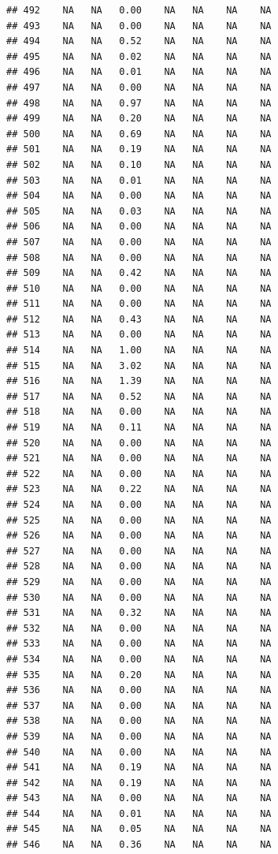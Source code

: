 \documentclass{article}\usepackage{graphicx, color}
\makeatletter
\newenvironment{kframe}{%
 \def\at@end@of@kframe{}%
 \ifinner\ifhmode%
  \def\at@end@of@kframe{\end{minipage}}%
  \begin{minipage}{\columnwidth}%
 \fi\fi%
 \def\FrameCommand##1{\hskip\@totalleftmargin \hskip-\fboxsep
 \colorbox{shadecolor}{##1}\hskip-\fboxsep
     \hskip-\linewidth \hskip-\@totalleftmargin \hskip\columnwidth}%
 \MakeFramed {\advance\hsize-\width
   \@totalleftmargin\z@ \linewidth\hsize
   \@setminipage}}%
 {\par\unskip\endMakeFramed%
 \at@end@of@kframe}
\newenvironment{knitrout}{}{} %
\makeatother
\begin{document}
\begin{knitrout}
\begin{kframe}
\begin{verbatim}
## 492    NA   NA   0.00    NA   NA    NA    NA
## 493    NA   NA   0.00    NA   NA    NA    NA
## 494    NA   NA   0.52    NA   NA    NA    NA
## 495    NA   NA   0.02    NA   NA    NA    NA
## 496    NA   NA   0.01    NA   NA    NA    NA
## 497    NA   NA   0.00    NA   NA    NA    NA
## 498    NA   NA   0.97    NA   NA    NA    NA
## 499    NA   NA   0.20    NA   NA    NA    NA
## 500    NA   NA   0.69    NA   NA    NA    NA
## 501    NA   NA   0.19    NA   NA    NA    NA
## 502    NA   NA   0.10    NA   NA    NA    NA
## 503    NA   NA   0.01    NA   NA    NA    NA
## 504    NA   NA   0.00    NA   NA    NA    NA
## 505    NA   NA   0.03    NA   NA    NA    NA
## 506    NA   NA   0.00    NA   NA    NA    NA
## 507    NA   NA   0.00    NA   NA    NA    NA
## 508    NA   NA   0.00    NA   NA    NA    NA
## 509    NA   NA   0.42    NA   NA    NA    NA
## 510    NA   NA   0.00    NA   NA    NA    NA
## 511    NA   NA   0.00    NA   NA    NA    NA
## 512    NA   NA   0.43    NA   NA    NA    NA
## 513    NA   NA   0.00    NA   NA    NA    NA
## 514    NA   NA   1.00    NA   NA    NA    NA
## 515    NA   NA   3.02    NA   NA    NA    NA
## 516    NA   NA   1.39    NA   NA    NA    NA
## 517    NA   NA   0.52    NA   NA    NA    NA
## 518    NA   NA   0.00    NA   NA    NA    NA
## 519    NA   NA   0.11    NA   NA    NA    NA
## 520    NA   NA   0.00    NA   NA    NA    NA
## 521    NA   NA   0.00    NA   NA    NA    NA
## 522    NA   NA   0.00    NA   NA    NA    NA
## 523    NA   NA   0.22    NA   NA    NA    NA
## 524    NA   NA   0.00    NA   NA    NA    NA
## 525    NA   NA   0.00    NA   NA    NA    NA
## 526    NA   NA   0.00    NA   NA    NA    NA
## 527    NA   NA   0.00    NA   NA    NA    NA
## 528    NA   NA   0.00    NA   NA    NA    NA
## 529    NA   NA   0.00    NA   NA    NA    NA
## 530    NA   NA   0.00    NA   NA    NA    NA
## 531    NA   NA   0.32    NA   NA    NA    NA
## 532    NA   NA   0.00    NA   NA    NA    NA
## 533    NA   NA   0.00    NA   NA    NA    NA
## 534    NA   NA   0.00    NA   NA    NA    NA
## 535    NA   NA   0.20    NA   NA    NA    NA
## 536    NA   NA   0.00    NA   NA    NA    NA
## 537    NA   NA   0.00    NA   NA    NA    NA
## 538    NA   NA   0.00    NA   NA    NA    NA
## 539    NA   NA   0.00    NA   NA    NA    NA
## 540    NA   NA   0.00    NA   NA    NA    NA
## 541    NA   NA   0.19    NA   NA    NA    NA
## 542    NA   NA   0.19    NA   NA    NA    NA
## 543    NA   NA   0.00    NA   NA    NA    NA
## 544    NA   NA   0.01    NA   NA    NA    NA
## 545    NA   NA   0.05    NA   NA    NA    NA
## 546    NA   NA   0.36    NA   NA    NA    NA

\end{verbatim}
\end{kframe}
\end{knitrout}
\end{document}
